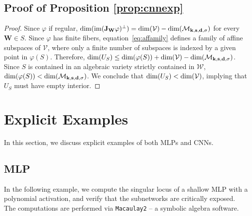\documentclass{article} %
\def\eqref#1{equation~\ref{#1}}
\theoremstyle{plain}%
\theoremstyle{definition}
\theoremstyle{remark}
\newcommand{\jacob}{\textnormal{\textbf{J}}}
\newcommand{\mfldconv}{\mathcal{M}_{\mathbf{k}, \mathbf{s}, \mathbf{d}, \sigma}}
\begin{document}
\subsection{Proof of Proposition \ref{prop:cnnexp}}\label{sec:proofcnnexp}
\begin{proof}
Since $\varphi$ if regular, $\textnormal{dim}(\textnormal{im}(\jacob_\mathbf{W}\varphi)^\perp) = \textnormal{dim}(\mathcal{V}) - \textnormal{dim}(\mfldconv)$ for every $\mathbf{W} \in S$. Since $\varphi$ has finite fibers, \eqref{eq:affamily} defines a family of affine subspaces of $\mathcal{V}$, where only a finite number of subspaces is indexed by a given point in $\varphi(S)$. Therefore, $\textnormal{dim}(U_S) \leq \textnormal{dim}(\varphi(S)) +  \textnormal{dim}(\mathcal{V}) - \textnormal{dim}(\mfldconv)$. Since $S$ is contained in an algebraic variety strictly contained in $\mathcal{W}$, $\textnormal{dim}(\varphi(S)) < \textnormal{dim}(\mfldconv)$. We conclude that $\textnormal{dim}(U_S) < \textnormal{dim}(\mathcal{V})$, implying that $U_S$ must have empty interior.  
\end{proof}


\section{Explicit Examples}
In this section, we discuss explicit examples of both MLPs and CNNs. 
\subsection{MLP}
\label{sec:exmp}
In the following example, we compute the singular locus of a shallow MLP with a polynomial activation, and verify that the subnetworks are critically exposed. The computations are performed via \texttt{Macaulay2} \citep{M2} -- a symbolic algebra software.
\end{document}
